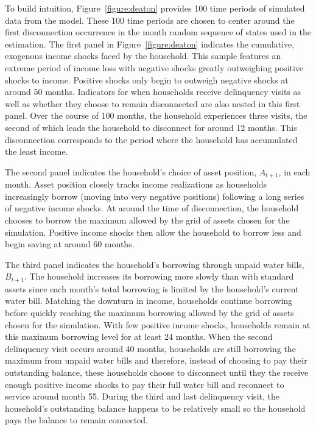\documentclass[12pt]{article}
\begin{document}
To build intuition, Figure~\ref{figure:deaton} provides 100 time periods of simulated data from the model.  These 100 time periods are chosen to center around the first disconnection occurrence in the month random sequence of states used in the estimation.  The first panel in Figure~\ref{figure:deaton} indicates the cumulative, exogenous income shocks faced by the household.  This sample features an extreme period of income loss with negative shocks greatly outweighing positive shocks to income.  Positive shocks only begin to outweigh negative shocks at around 50 months.  Indicators for when households receive delinquency visits as well as whether they choose to remain disconnected are also nested in this first panel.  Over the course of 100 months, the household experiences three visits, the second of which leads the household to disconnect for around 12 months.  This disconnection corresponds to the period where the household has accumulated the least income.

The second panel indicates the household's choice of asset position, $A_{t+1}$, in each month.  Asset position closely tracks income realizations as households increasingly borrow (moving into very negative positions) following a long series of negative income shocks.  At around the time of disconnection, the household chooses to borrow the maximum allowed by the grid of assets chosen for the simulation.  Positive income shocks then allow the household to borrow less and begin saving at around 60 months.

The third panel indicates the household's borrowing through unpaid water bills, $B_{t+1}$.  The household increases its borrowing more slowly than with standard assets since each month's total borrowing is limited by the household's current water bill.  Matching the downturn in income, households continue borrowing before quickly reaching the maximum borrowing allowed by the grid of assets chosen for the simulation.  With few positive income shocks, households remain at this maximum borrowing level for at least 24 months.  When the second delinquency visit occurs around 40 months, households are still borrowing the maximum from unpaid water bills and therefore, instead of choosing to pay their outstanding balance, these households choose to disconnect until they the receive enough positive income shocks to pay their full water bill and reconnect to service around month 55.  During the third and last delinquency visit, the household's outstanding balance happens to be relatively small so the household pays the balance to remain connected.
\end{document}
